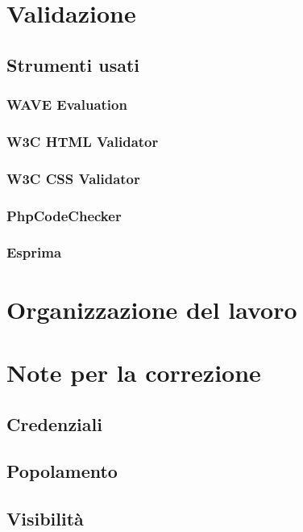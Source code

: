 \documentclass[a4paper]{article}
\begin{document}
	\newpage

	\section{Validazione}
		\subsection{Strumenti usati}
			
			\subsubsection{WAVE Evaluation}
				
			\subsubsection{W3C HTML Validator}
				
			\subsubsection{W3C CSS Validator}
				
			\subsubsection{PhpCodeChecker}
				
			\subsubsection{Esprima}
				
				
	\newpage

	\section{Organizzazione del lavoro}
		
	
	\newpage
	
	\appendix
	\section{Note per la correzione}
		
		\subsection{Credenziali}
			
		\subsection{Popolamento}
			
		\subsection{Visibilità}
			
    
\end{document}
